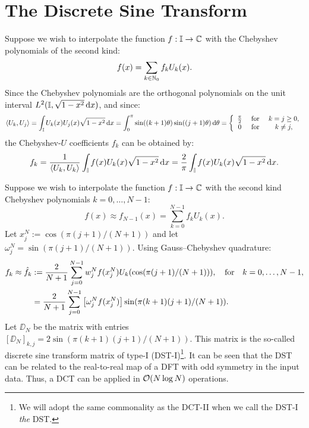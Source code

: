 \section{The Discrete Sine Transform}

Suppose we wish to interpolate the function $f:\mathbb{I}\to\mathbb{C}$ with the Chebyshev polynomials of the second kind:
\begin{equation}
f(x) = \sum_{k\in\mathbb{N}_0} f_k U_k(x).
\end{equation}
Since the Chebyshev polynomials are the orthogonal polynomials on the unit interval $L^2(\mathbb{I},\sqrt{1-x^2}{\rm\,d} x)$, and since:
\begin{equation}
\langle U_k, U_j\rangle = \int_{\mathbb{I}} U_k(x)U_j(x)\sqrt{1-x^2}{\rm\,d} x = \int_0^\pi \sin((k+1)\theta)\sin((j+1)\theta){\rm\,d}\theta = \left\{\begin{array}{ccc} \frac{\pi}{2} & \hbox{ for } & k = j \ge 0,\\
0 & \hbox{ for } & k \ne j,
\end{array}\right.
\end{equation}
the Chebyshev-$U$ coefficients $f_k$ can be obtained by:
\begin{equation}
f_k = \dfrac{1}{\langle U_k,U_k\rangle}\int_{\mathbb{I}} f(x)U_k(x)\sqrt{1-x^2}{\rm\,d} x = \dfrac{2}{\pi}\int_{\mathbb{I}} f(x)U_k(x)\sqrt{1-x^2}{\rm\,d} x.
\end{equation}

Suppose we wish to interpolate the function $f:\mathbb{I}\to\mathbb{C}$ with the second kind Chebyshev polynomials $k=0,\ldots,N-1$:
\begin{equation}
f(x) \approx f_{N-1}(x) = \sum_{k=0}^{N-1} f_k U_k(x).
\end{equation}
Let $x_j^N := \cos(\pi(j+1)/(N+1))$ and let $\omega_j^N = \sin(\pi(j+1)/(N+1))$. Using Gauss--Chebyshev quadrature:
\begin{align}
f_k \approx \hat{f}_k & := \dfrac{2}{N+1}\sum_{j=0}^{N-1} w_j^Nf(x_j^N)U_k(\cos(\pi (j+1)/(N+1))),\quad{\rm for}\quad k=0,\ldots,N-1,\\
& = \dfrac{2}{N+1}\sum_{j=0}^{N-1} \left[\omega_j^Nf(x_j^N)\right]\sin(\pi (k+1)(j+1)/(N+1)).
\end{align}
Let $\DD_N$ be the matrix with entries $[\DD_N]_{k,j} = 2\sin(\pi (k+1)(j+1)/(N+1))$. This matrix is the so-called discrete sine transform matrix of type-I (DST-I)\footnote{We will adopt the same commonality as the DCT-II when we call the DST-I {\em the} DST.}. It can be seen that the DST can be related to the real-to-real map of a DFT with odd symmetry in the input data. Thus, a DCT can be applied in $\mathcal{O}(N\log N)$ operations.

